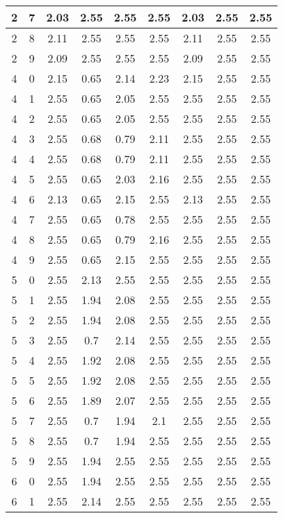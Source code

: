 \begin{longtable}{|c|c||c||c|c|c||c|c|c|}
	2 & 7 & 2.03 & 2.55 & 2.55 & 2.55 & 2.03 & 2.55 & 2.55 \\ \hline
	2 & 8 & 2.11 & 2.55 & 2.55 & 2.55 & 2.11 & 2.55 & 2.55 \\ \hline
	2 & 9 & 2.09 & 2.55 & 2.55 & 2.55 & 2.09 & 2.55 & 2.55 \\ \hline
	4 & 0 & 2.15 & 0.65 & 2.14 & 2.23 & 2.15 & 2.55 & 2.55 \\ \hline
	4 & 1 & 2.55 & 0.65 & 2.05 & 2.55 & 2.55 & 2.55 & 2.55 \\ \hline
	4 & 2 & 2.55 & 0.65 & 2.05 & 2.55 & 2.55 & 2.55 & 2.55 \\ \hline
	4 & 3 & 2.55 & 0.68 & 0.79 & 2.11 & 2.55 & 2.55 & 2.55 \\ \hline
	4 & 4 & 2.55 & 0.68 & 0.79 & 2.11 & 2.55 & 2.55 & 2.55 \\ \hline
	4 & 5 & 2.55 & 0.65 & 2.03 & 2.16 & 2.55 & 2.55 & 2.55 \\ \hline
	4 & 6 & 2.13 & 0.65 & 2.15 & 2.55 & 2.13 & 2.55 & 2.55 \\ \hline
	4 & 7 & 2.55 & 0.65 & 0.78 & 2.55 & 2.55 & 2.55 & 2.55 \\ \hline
	4 & 8 & 2.55 & 0.65 & 0.79 & 2.16 & 2.55 & 2.55 & 2.55 \\ \hline
	4 & 9 & 2.55 & 0.65 & 2.15 & 2.55 & 2.55 & 2.55 & 2.55 \\ \hline
	5 & 0 & 2.55 & 2.13 & 2.55 & 2.55 & 2.55 & 2.55 & 2.55 \\ \hline
	5 & 1 & 2.55 & 1.94 & 2.08 & 2.55 & 2.55 & 2.55 & 2.55 \\ \hline
	5 & 2 & 2.55 & 1.94 & 2.08 & 2.55 & 2.55 & 2.55 & 2.55 \\ \hline
	5 & 3 & 2.55 & 0.7 & 2.14 & 2.55 & 2.55 & 2.55 & 2.55 \\ \hline
	5 & 4 & 2.55 & 1.92 & 2.08 & 2.55 & 2.55 & 2.55 & 2.55 \\ \hline
	5 & 5 & 2.55 & 1.92 & 2.08 & 2.55 & 2.55 & 2.55 & 2.55 \\ \hline
	5 & 6 & 2.55 & 1.89 & 2.07 & 2.55 & 2.55 & 2.55 & 2.55 \\ \hline
	5 & 7 & 2.55 & 0.7 & 1.94 & 2.1 & 2.55 & 2.55 & 2.55 \\ \hline
	5 & 8 & 2.55 & 0.7 & 1.94 & 2.55 & 2.55 & 2.55 & 2.55 \\ \hline
	5 & 9 & 2.55 & 1.94 & 2.55 & 2.55 & 2.55 & 2.55 & 2.55 \\ \hline
	6 & 0 & 2.55 & 1.94 & 2.55 & 2.55 & 2.55 & 2.55 & 2.55 \\ \hline
	6 & 1 & 2.55 & 2.14 & 2.55 & 2.55 & 2.55 & 2.55 & 2.55 \\ \hline

\end{longtable}
